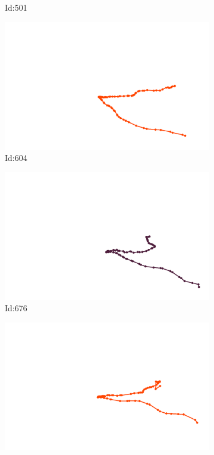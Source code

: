 \documentclass[12pt,twoside]{report}
\begin{document}
\begin{figure}
\begin{subfigure}[b]{0.20\textwidth}
\caption{Id:501}
\end{subfigure}
\begin{subfigure}[b]{0.20\textwidth}
\centering
\includegraphics[width=\textwidth]{../../trajectories/604.png}
\caption{Id:604}
\end{subfigure}
\begin{subfigure}[b]{0.20\textwidth}
\centering
\includegraphics[width=\textwidth]{../../trajectories/676.png}
\caption{Id:676}
\end{subfigure}
\begin{subfigure}[b]{0.20\textwidth}
\centering
\includegraphics[width=\textwidth]{../../trajectories/793.png}

\end{subfigure}
\end{figure}
\end{document}
